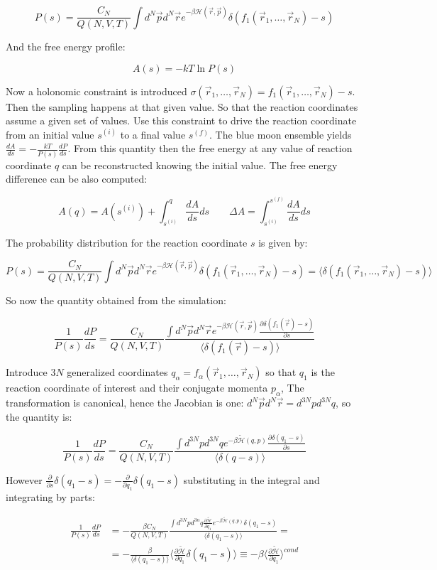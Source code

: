 	$$P(s) = \frac{C_N}{Q(N, V, T)}\int d^N\vec{p}d^N\vec{r}e^{-\beta\mathcal{H}(\vec{r}, \vec{p})}\delta(f_1(\vec{r}_1, \dots, \vec{r}_N)-s)$$

	And the free energy profile:

	$$A(s) = -kT\ln P(s)$$

	Now a holonomic constraint is introduced $\sigma(\vec{r}_1, \dots, \vec{r}_N) = f_1(\vec{r}_1, \dots, \vec{r}_N)-s$.
	Then the sampling happens at that given value.
	So that the reaction coordinates assume a given set of values.
	Use this constraint to drive the reaction coordinate from an initial value $s^{(i)}$ to a final value $s^{(f)}$.
	The blue moon ensemble yields $\frac{dA}{ds} = -\frac{kT}{P(s)}\frac{dP}{ds}$.
	From this quantity then the free energy at any value of reaction coordinate $q$ can be reconstructed knowing the initial value.
	The free energy difference can be also computed:

	$$A(q) = A(s^{(i)}) + \int_{s^{(i)}}^q\frac{dA}{ds}ds\qquad \Delta A = \int_{s^{(i)}}^{s^{(f)}}\frac{dA}{ds}ds$$

	The probability distribution for the reaction coordinate $s$ is given by:

	$$P(s) = \frac{C_N}{Q(N, V, T)}\int d^N\vec{p}d^N\vec{r}e^{-\beta\mathcal{H}(\vec{r}, \vec{p})}\delta(f_1(\vec{r}_1, \dots, \vec{r}_N)-s) = \langle\delta(f_1(\vec{r}_1, \dots, \vec{r}_N)-s)\rangle$$

	So now the quantity obtained from the simulation:

	$$\frac{1}{P(s)}\frac{dP}{ds} = \frac{C_N}{Q(N, V, T)}\frac{\int d^N\vec{p}d^N\vec{r}e^{-\beta\mathcal{H}(\vec{r}, \vec{p})}\frac{\partial\delta(f_1(\vec{r})-s)}{\partial s}}{\langle\delta(f_1(\vec{r})-s)\rangle}$$

	Introduce $3N$ generalized coordinates $q_\alpha = f_\alpha(\vec{r}_1, \dots, \vec{r}_N)$ so that $q_1$ is the reaction coordinate of interest and their conjugate momenta $p_\alpha$,
	The transformation is canonical, hence the Jacobian is one: $d^N\vec{p}d^N\vec{r} = d^{3N}pd^{3N}q$, so the quantity is:

	$$\frac{1}{P(s)}\frac{dP}{ds} = \frac{C_N}{Q(N, V, T)}\frac{\int d^{3N}pd^{3N}qe^{-\beta\tilde{\mathcal{H}}(q, p)}\frac{\partial\delta(q_1-s)}{\partial s}}{\langle\delta(q-s)\rangle}$$

	However $\frac{\partial}{\partial s}\delta(q_1-s) = -\frac{\partial}{\partial q_1}\delta(q_1-s)$ substituting in the integral and integrating by parts:

	\begin{align*}
		\frac{1}{P(s)}\frac{dP}{ds} &=-\frac{\beta C_N}{Q(N, V, T)}\frac{\int d^{3N}pd^{3n}q\frac{\partial\tilde{\mathcal{H}}}{\partial q_1}e^{-\beta\tilde{\mathcal{H}}(q, p)}\delta(q_1-s)}{\langle\delta(q_1-s)\rangle} = \\
																&= -\frac{\beta}{\langle\delta(q_1-s)\rangle}\biggl\langle\frac{\partial\tilde{\mathcal{H}}}{\partial q_1}\delta(q_1-s)\biggr\rangle \equiv -\beta\biggl\langle\frac{\partial\tilde{\mathcal{H}}}{\partial q_1}\biggr\rangle^{cond}
	\end{align*}

